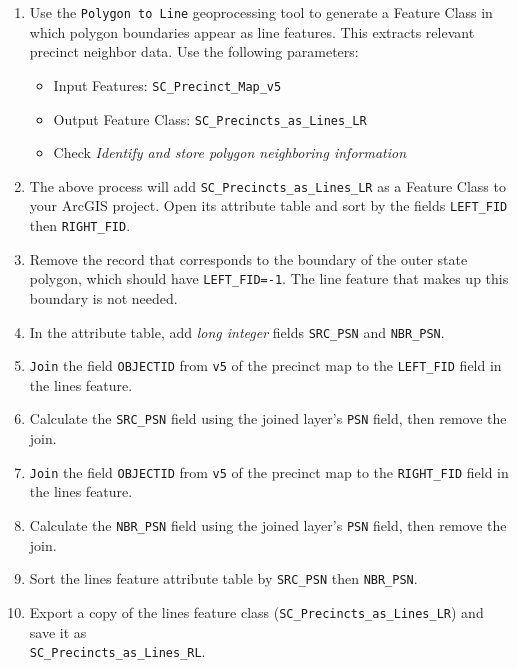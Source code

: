 \documentclass[11pt]{article}
\begin{document}
\begin{enumerate}
\item Use the \verb|Polygon to Line| geoprocessing tool to generate a Feature Class in which polygon boundaries appear as line features. This extracts relevant precinct neighbor data. Use the following parameters:
\begin{itemize}
	\item Input Features: \verb|SC_Precinct_Map_v5|
	\item Output Feature Class: \verb|SC_Precincts_as_Lines_LR|
	\item Check \textit{Identify and store polygon neighboring information}
\end{itemize}

\item The above process will add \verb|SC_Precincts_as_Lines_LR| as a Feature Class to your ArcGIS project. Open its attribute table and sort by the fields \verb|LEFT_FID| then \verb|RIGHT_FID|.

\item Remove the record that corresponds to the boundary of the outer state polygon, which should have \verb|LEFT_FID=-1|. The line feature that makes up this boundary is not needed.

\item In the attribute table, add \textit{long integer} fields \verb|SRC_PSN| and \verb|NBR_PSN|.

\item \verb|Join| the field \verb|OBJECTID| from \verb|v5| of the precinct map to the \verb|LEFT_FID| field in the lines feature. 

\item Calculate the \verb|SRC_PSN| field using the joined layer's \verb|PSN| field, then remove the join.

\item \verb|Join| the field \verb|OBJECTID| from \verb|v5| of the precinct map to the \verb|RIGHT_FID| field in the lines feature.

\item Calculate the \verb|NBR_PSN| field using the joined layer's \verb|PSN| field, then remove the join.

\item Sort the lines feature attribute table by \verb|SRC_PSN| then \verb|NBR_PSN|.

\item Export a copy of the lines feature class (\verb|SC_Precincts_as_Lines_LR|) and save it as \\
\verb|SC_Precincts_as_Lines_RL|.


\end{enumerate}
\end{document}
